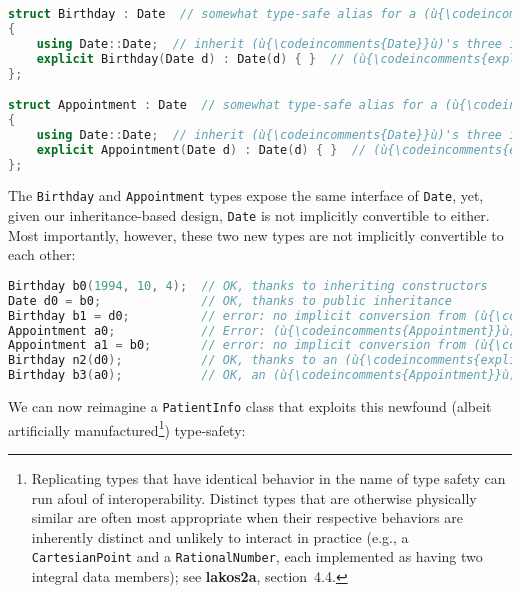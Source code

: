 \begin{lstlisting}[language=C++]
struct Birthday : Date  // somewhat type-safe alias for a (ù{\codeincomments{Date}}ù)
{
    using Date::Date;  // inherit (ù{\codeincomments{Date}}ù)'s three integer ctor
    explicit Birthday(Date d) : Date(d) { }  // (ù{\codeincomments{explicit}}ù) conversion from (ù{\codeincomments{Date}}ù)
};

struct Appointment : Date  // somewhat type-safe alias for a (ù{\codeincomments{Date}}ù)
{
    using Date::Date;  // inherit (ù{\codeincomments{Date}}ù)'s three integer ctor
    explicit Appointment(Date d) : Date(d) { }  // (ù{\codeincomments{explicit}}ù) conv. from (ù{\codeincomments{Date}}ù)
};
\end{lstlisting}
    
\noindent The \texttt{Birthday} and \texttt{Appointment} types expose the same
interface of \texttt{Date}, yet, given our inheritance-based design,
\texttt{Date} is not implicitly convertible to either. Most importantly,
however, these two new types are not implicitly convertible to each
other:

\begin{lstlisting}[language=C++]
Birthday b0(1994, 10, 4);  // OK, thanks to inheriting constructors
Date d0 = b0;              // OK, thanks to public inheritance
Birthday b1 = d0;          // error: no implicit conversion from (ù{\codeincomments{Date}}ù)
Appointment a0;            // Error: (ù{\codeincomments{Appointment}}ù) has no default ctor.
Appointment a1 = b0;       // error: no implicit conversion from (ù{\codeincomments{Birthday}}ù)
Birthday n2(d0);           // OK, thanks to an (ù{\codeincomments{explicit}}ù) constructor in (ù{\codeincomments{Birthday}}ù)
Birthday b3(a0);           // OK, an (ù{\codeincomments{Appointment}}ù) (unfortunately) is a (ù{\codeincomments{Date}}ù).
\end{lstlisting}
    
\noindent We can now reimagine a \texttt{PatientInfo} class that exploits this
newfound (albeit artificially manufactured{\cprotect\footnote{Replicating
types that have identical behavior in the name of type safety can run
afoul of interoperability. Distinct types that are otherwise
physically similar are often most appropriate when their respective
behaviors are inherently distinct and unlikely to interact in practice
(e.g., a \mbox{\texttt{CartesianPoint}} and a \mbox{\texttt{RationalNumber}},
each implemented as having two integral data members); see
  \textbf{{lakos2a}}, section~4.4.}}) type-safety:

